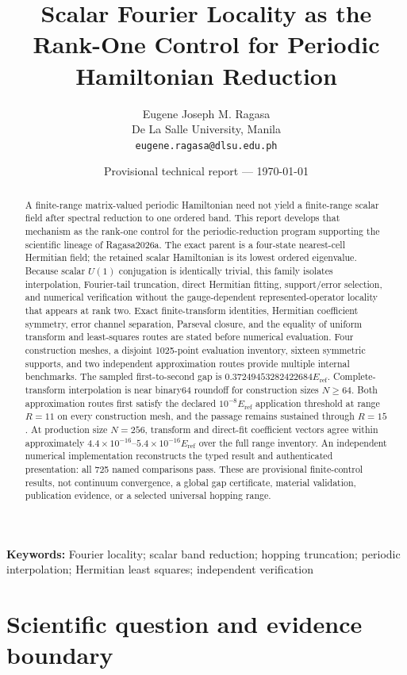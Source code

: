 \documentclass[11pt]{article}
\title{Scalar Fourier Locality as the Rank-One Control for Periodic Hamiltonian Reduction}
\author{Eugene Joseph M. Ragasa\\De La Salle University, Manila\\\texttt{eugene.ragasa@dlsu.edu.ph}}
\date{Provisional technical report --- \today}
\newcommand{\eref}{E_{\mathrm{ref}}}
\begin{document}
\maketitle

\begin{abstract}
A finite-range matrix-valued periodic Hamiltonian need not yield a finite-range scalar
field after spectral reduction to one ordered band.  This report develops that mechanism
as the rank-one control for the periodic-reduction program supporting the scientific
lineage of Ragasa2026a.  The exact parent is a four-state nearest-cell Hermitian field;
the retained scalar Hamiltonian is its lowest ordered eigenvalue.  Because scalar
$U(1)$ conjugation is identically trivial, this family isolates interpolation,
Fourier-tail truncation, direct Hermitian fitting, support/error selection, and numerical
verification without the gauge-dependent represented-operator locality that appears at
rank two.  Exact finite-transform identities, Hermitian coefficient symmetry, error
channel separation, Parseval closure, and the equality of uniform transform and
least-squares routes are stated before numerical evaluation.  Four construction meshes,
a disjoint 1025-point evaluation inventory, sixteen symmetric supports, and two
independent approximation routes provide multiple internal benchmarks.  The sampled
first-to-second gap is $0.37249453282422684\eref$.  Complete-transform interpolation is
near binary64 roundoff for construction sizes $N\ge64$.  Both approximation routes first
satisfy the declared $10^{-8}\eref$ application threshold at range $R=11$ on every
construction mesh, and the passage remains sustained through $R=15$.  At production
size $N=256$, transform and direct-fit coefficient vectors agree within approximately
$4.4\times10^{-16}$--$5.4\times10^{-16}\eref$ over the full range inventory.  An
independent numerical implementation reconstructs the typed result and authenticated
presentation: all 725 named comparisons pass.  These are provisional finite-control
results, not continuum convergence, a global gap certificate, material validation,
publication evidence, or a selected universal hopping range.
\end{abstract}

\noindent\textbf{Keywords:} Fourier locality; scalar band reduction; hopping truncation;
periodic interpolation; Hermitian least squares; independent verification

\section{Scientific question and evidence boundary}
\end{document}
